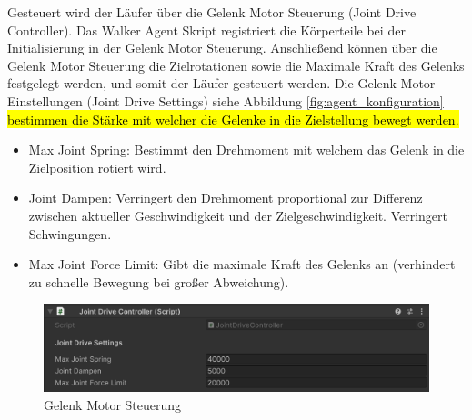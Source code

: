 Gesteuert wird der Läufer über die Gelenk Motor Steuerung (Joint Drive Controller). Das Walker Agent Skript registriert die Körperteile bei der Initialisierung in der Gelenk Motor Steuerung. Anschließend können über die Gelenk Motor Steuerung die Zielrotationen sowie die Maximale Kraft des Gelenks festgelegt werden, und somit der Läufer gesteuert werden. Die Gelenk Motor Einstellungen (Joint Drive Settings) siehe Abbildung \ref{fig:agent_konfiguration} \hl{bestimmen die Stärke mit welcher die Gelenke in die Zielstellung bewegt werden.}
\begin{itemize}
  \item Max Joint Spring: Bestimmt den Drehmoment mit welchem das Gelenk in die Zielposition rotiert wird.
  \item Joint Dampen: Verringert den Drehmoment proportional zur Differenz zwischen aktueller Geschwindigkeit und der Zielgeschwindigkeit. Verringert Schwingungen.
  \item Max Joint Force Limit: Gibt die maximale Kraft des Gelenks an (verhindert zu schnelle Bewegung bei großer Abweichung).
\end{itemize}
\begin{figure}[H]
  \centering  
  \includegraphics[scale=0.5]{img/gelenk_motor_steuerung.png}
  \caption{Gelenk Motor Steuerung}
  \label{fig:gelenk_motor_steuerung}
\end{figure}


